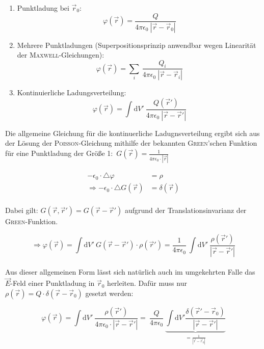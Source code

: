 \begin{enumerate}
\item Punktladung bei $\vec{r}_0$:
\begin{equation*}
\varphi(\vec{r}) = \frac{Q}{4\pi\epsilon_0 \ |\vec{r}-\vec{r}_0|}
\end{equation*}


\item Mehrere Punktladungen (Superpositionsprinzip anwendbar wegen Linearität der \textsc{Maxwell}-Gleichungen):
\begin{equation*}
\varphi(\vec{r}) = \sum\limits_i \ \frac{Q_i}{4\pi\epsilon_0 \ |\vec{r}-\vec{r}_i|}
\end{equation*}

\item Kontinuierliche Ladungsverteilung:
\begin{equation*}
\varphi(\vec{r}) = \int\mathrm{d}V' \ \frac{Q(\vec{r}')}{4\pi\epsilon_0 \ |\vec{r}-\vec{r}'|}
\end{equation*}
\end{enumerate}

Die allgemeine Gleichung für die kontinuerliche Ladugnsverteilung ergibt sich aus der Lösung der \textsc{Poisson}-Gleichung mithilfe der bekannten \textsc{Green}'schen Funktion für eine Punktladung der Größe 1:\ $G(\vec{r}) = \frac{1}{4\pi\epsilon_0 \cdot |\vec{r}|}$\

\begin{align*}
-\epsilon_0 \cdot \bigtriangleup\varphi &= \rho\\
\Rightarrow -\epsilon_0 \cdot \bigtriangleup G(\vec{r}) &= \delta(\vec{r})\\
\end{align*}

Dabei gilt: $G(\vec{r},\vec{r}') = G(\vec{r}-\vec{r}')$ aufgrund der Translationsinvarianz der \textsc{Green}-Funktion.

\begin{equation*}
\Rightarrow \varphi(\vec{r}) = \int\mathrm{d}V' \ G(\vec{r}-\vec{r}')\cdot\rho(\vec{r}') = \frac{1}{4\pi\epsilon_0} \ \int\mathrm{d}V' \ \frac{\rho(\vec{r}')}{|\vec{r}-\vec{r}'|}
\end{equation*}
\ \\

Aus dieser allgemeinen Form lässt sich natürlich auch im umgekehrten Falle das $\vec{E}$-Feld einer Punktladung in $\vec{r}_0$ herleiten. Dafür muss nur $\rho(\vec{r}) = Q\cdot\delta(\vec{r}-\vec{r}_0)$ gesetzt werden:

\begin{equation*}
\varphi(\vec{r}) = \int\mathrm{d}V' \ \frac{\rho(\vec{r}')}{4\pi\epsilon_0 \cdot |\vec{r}-\vec{r}'|} = \ \frac{Q}{4\pi\epsilon_0} \ \underbrace{\int\mathrm{d}V'\frac{\delta(\vec{r}'-\vec{r}_0)}{|\vec{r}-\vec{r}'|}}_{=\frac{1}{|\vec{r}-\vec{r}_0|}}
\end{equation*}

